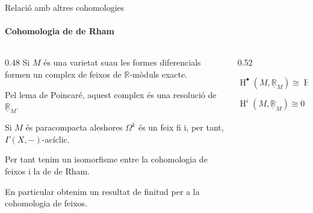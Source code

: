\documentclass[notheorems, aspectratio=169]{beamer}
\begin{document}
\begin{frame}[fragile]{Relació amb altres cohomologies}
  \framesubtitle{Cohomologia de de Rham}
  \begin{columns}[T]
    \begin{column}{0.48\textwidth}
       {
        Si \(M\) és una varietat suau les \alert<1>{formes diferencials} formen un complex de feixos de \(\mathbb{R}\)-mòduls exacte.
      }

       {
        Pel \alert<2>{lema de Poincaré}, aquest complex és una resolució de \(\underline{\mathbb{R}}_{M}\).
      }

       {
        Si \(M\) és paracompacta aleshores \(\Omega^{k}\) és un \alert<3>{feix fi} i, per tant, \alert<3>{\(\Gamma(X, -)\)-acíclic}.
      }

       {
        Per tant tenim un \alert<4>{isomorfisme} entre la cohomologia de feixos i la de de Rham.
      }

       {
        En particular obtenim un resultat de \alert<5>{finitud} per a la cohomologia de feixos.
      }
    \end{column}
    \begin{column}{0.52\textwidth}
      \begin{center}
        
         {
          \begin{equation*}
            \operatorname{H}^{\bullet}(M, \underline{\mathbb{R}}_{M}) \cong \operatorname{H}^{\bullet}_{\text{dR}}(M, \mathbb{R})
          \end{equation*}
        }

         {
          \begin{equation*}
            \operatorname{H}^{i}(M, \underline{\mathbb{R}}_{M}) \cong 0 \quad \forall i > \dim M
          \end{equation*}
        }
      \end{center}
    \end{column}
  \end{columns}
\end{frame}
\end{document}
